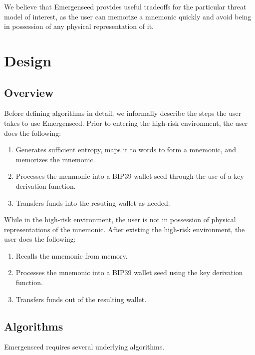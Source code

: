 \documentclass{article}
\begin{document}
We believe that Emergenseed provides useful tradeoffs for the particular threat model of interest, as the user can memorize a mnemonic quickly and avoid being in possession of any physical representation of it.


\section{Design}

\subsection{Overview}

Before defining algorithms in detail, we informally describe the steps the user takes to use Emergenseed.
Prior to entering the high-risk environment, the user does the following:
\begin{enumerate}
	\item Generates sufficient entropy, maps it to words to form a mnemonic, and memorizes the mnemonic.
	\item Processes the menmonic into a BIP39 wallet seed through the use of a key derivation function.
	\item Transfers funds into the resuting wallet as needed.
\end{enumerate}
While in the high-risk environment, the user is not in possession of physical representations of the mnemonic.
After existing the high-risk environment, the user does the following:
\begin{enumerate}
	\item Recalls the mnemonic from memory.
	\item Processes the mnemonic into a BIP39 wallet seed using the key derivation function.
	\item Transfers funds out of the resulting wallet.
\end{enumerate}


\subsection{Algorithms}

Emergenseed requires several underlying algorithms.
\end{document}

